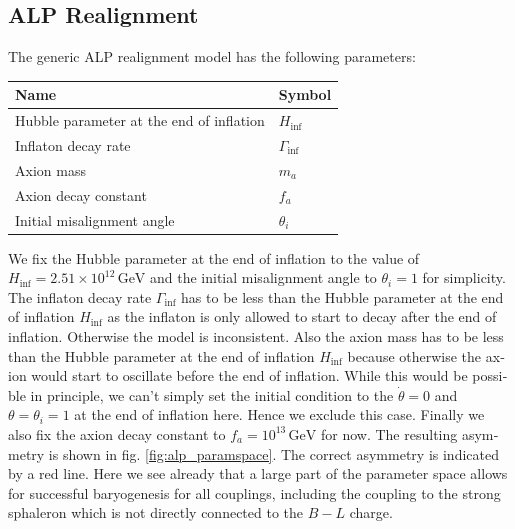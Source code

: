 \documentclass[master,       %
               twoside,        %
               BCOR10mm,       %
               english,ngerman, %
               ]{GAUBM}
\begin{document}
\begin{otherlanguage}{english}
\section{ALP Realignment}
The generic ALP realignment model has the following parameters:
\begin{table}[H]
	\begin{center}
		\begin{tabular}{ll}
			Name & Symbol \\
			\hline
			Hubble parameter at the end of inflation & $H_\mathrm{inf}$ \\
			Inflaton decay rate  & $\Gamma_\mathrm{inf}$ \\
			Axion mass & $m_a$ \\
			Axion decay constant & $f_a$ \\
			Initial misalignment angle & $\theta_i$ \\
		\end{tabular}
	\end{center}
\end{table}
We fix the Hubble parameter at the end of inflation to the value of $H_\mathrm{inf} = 2.51 \times 10^{12} \, \mathrm{GeV}$ and the initial misalignment angle to $\theta_i = 1$ for simplicity.
The inflaton decay rate $\Gamma_\mathrm{inf}$ has to be less than the Hubble parameter at the end of inflation $H_\mathrm{inf}$ as the inflaton is only allowed to start to decay after the end of inflation. Otherwise the model is inconsistent. Also the axion mass has to be less than the Hubble parameter at the end of inflation $H_\mathrm{inf}$ because otherwise the axion would start to oscillate before the end of inflation. While this would be possible in principle, we can't simply set the initial condition to the $\dot{\theta} = 0$ and $\theta = \theta_i = 1$ at the end of inflation here. Hence we exclude this case.
Finally we also fix the axion decay constant to $f_a = 10^{13} \, \mathrm{GeV}$ for now.
The resulting asymmetry is shown in fig. \ref{fig:alp_paramspace}. The correct asymmetry is indicated by a red line. Here we see already that a large part of the parameter space allows for successful baryogenesis for all couplings, including the coupling to the strong sphaleron which is not directly connected to the $B - L$ charge.

\end{otherlanguage}
\end{document}
